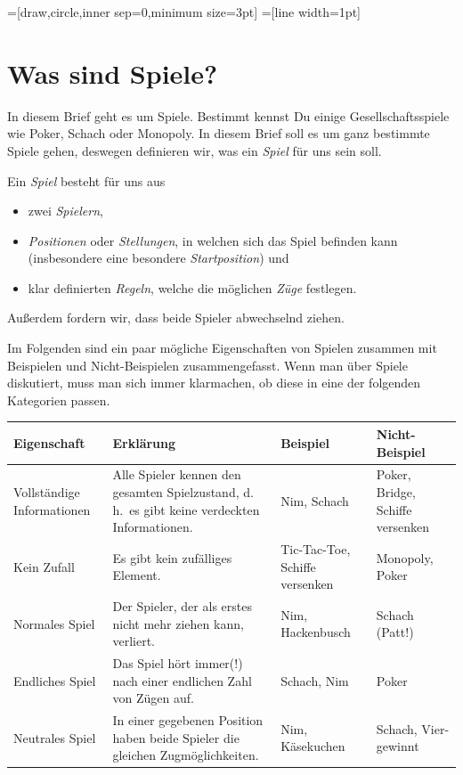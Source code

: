 \documentclass{zirkelbrief1516}
\begin{document}
=[draw,circle,inner sep=0,minimum size=3pt]
=[line width=1pt]

\makeheader

\section*{Was sind Spiele?}

In diesem Brief geht es um Spiele. Bestimmt kennst Du einige Gesellschaftsspiele wie Poker, Schach oder Monopoly. In diesem Brief soll es um ganz bestimmte Spiele gehen, deswegen definieren wir, was ein \emph{Spiel} f\"ur uns sein soll.

\begin{definition}
  Ein \emph{Spiel} besteht für uns aus
  \begin{itemize}
    \item zwei \emph{Spielern},
    \item \emph{Positionen} oder \emph{Stellungen}, in welchen sich das Spiel befinden kann (insbesondere eine besondere \emph{Startposition}) und
    \item klar definierten \emph{Regeln}, welche die möglichen \emph{Züge} festlegen.
  \end{itemize}
  Außerdem fordern wir, dass beide Spieler abwechselnd ziehen.
\end{definition}

Im Folgenden sind ein paar mögliche Eigenschaften von Spielen zusammen mit Beispielen und Nicht-Beispielen zusammengefasst. Wenn man über Spiele diskutiert, muss man sich immer klarmachen, ob diese in eine der folgenden Kategorien passen.

\begin{center}
  \begin{tabular}{ | p{2.4cm} | p{5.6cm} | p{2.5cm} | p{2.5cm} |}
    \hline
    Eigenschaft & Erklärung & Beispiel & Nicht-Beispiel \\ \hline
    Vollständige Informationen & Alle Spieler kennen den gesamten Spielzustand, d.\,h.\ es gibt keine verdeckten Informationen. & Nim, Schach &  Poker, Bridge, Schiffe versenken \\[5pt]
    Kein Zufall & Es gibt kein zufälliges Element. & Tic-Tac-Toe, Schiffe versenken &  Monopoly, Poker \\[5pt] 
    Normales Spiel & Der Spieler, der als erstes nicht mehr ziehen kann, verliert. & Nim, Hackenbusch & Schach (Patt!) \\[20pt]
    Endliches Spiel & Das Spiel hört immer(!) nach einer endlichen Zahl von Zügen auf. & Schach, Nim & Poker \\[20pt]
    Neutrales Spiel & In einer gegebenen Position haben beide Spieler die gleichen Zugmöglichkeiten. & Nim, Käsekuchen & Schach, Vier-gewinnt\\[5pt] \hline
  \end{tabular}
\end{center}
\end{document}
